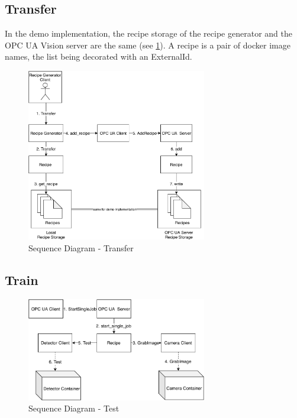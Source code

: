 \subsection{Transfer}
In the demo implementation, the recipe storage of the recipe generator and the OPC UA Vision server are the same (see \ref{fig:SequenceDiagram-Transfer}). A recipe is a pair of docker image names, the list being decorated with an ExternalId. 
\begin{figure}[ht]
	\centering
  \includegraphics[width=0.7\textwidth]{img/SequenceDiagram-Transfer.pdf}
	\caption{Sequence Diagram - Transfer}
	\label{fig:SequenceDiagram-Transfer}
\end{figure}

\subsection{Train}
\begin{figure}[ht]
	\centering
  \includegraphics[width=0.7\textwidth]{img/SequenceDiagram-Test.pdf}
	\caption{Sequence Diagram - Test}
	\label{fig:SequenceDiagram-Test}
\end{figure}

